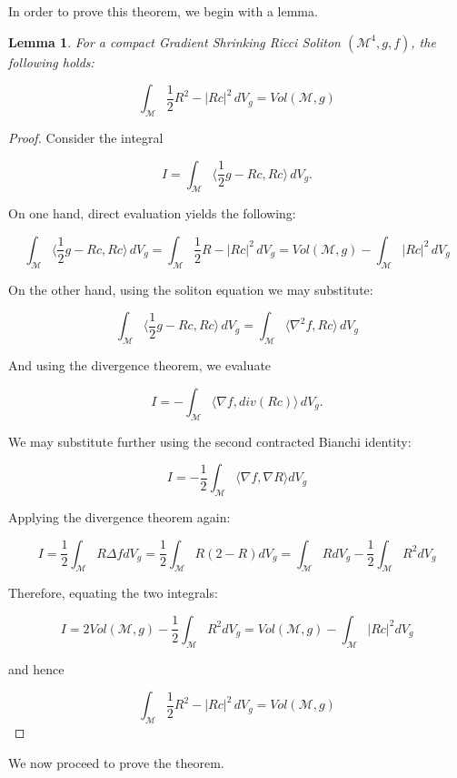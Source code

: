 \documentclass[openany, amssymb, psamsfonts]{amsart}
\newtheorem{lem}{Lemma}[section]
\theoremstyle{definition}
\numberwithin{equation}{section}
\begin{document}
In order to prove this theorem, we begin with a lemma. 

\begin{lem}
    For a compact Gradient Shrinking Ricci Soliton $(\mathcal{M}^4, g, f)$, the following holds:

    $$\int_{\mathcal{M}} \frac{1}{2} R^2 - |Rc|^2 \,dV_g = Vol(\mathcal{M}, g) $$
\end{lem}

\begin{proof}
Consider the integral

$$ I = \int_{\mathcal{M}} \langle \frac{1}{2}g - Rc, Rc \rangle \,dV_g.$$

On one hand, direct evaluation yields the following:

$$\int_{\mathcal{M}} \langle \frac{1}{2}g - Rc, Rc \rangle \,dV_g = 
 \int_{\mathcal{M}} \frac{1}{2}R - |Rc|^2 \,dV_g = 
 Vol(\mathcal{M}, g) - \int_{\mathcal{M}} |Rc|^2  \,dV_g$$

On the other hand, using the soliton equation we may substitute:

$$\int_{\mathcal{M}} \langle \frac{1}{2}g - Rc, Rc \rangle \,dV_g = 
\int_{\mathcal{M}} \langle \nabla ^2 f, Rc \rangle \,dV_g$$

And using the divergence theorem, we evaluate 

$$I = - \int_{\mathcal{M}} \langle \nabla f, div(Rc) \rangle \,dV_g.$$

We may substitute further using the second contracted Bianchi identity:

$$I = - \frac{1}{2} \int_{\mathcal{M}} \langle \nabla f, \nabla R \rangle dV_g$$

Applying the divergence theorem again:

$$I = \frac{1}{2}\int_{\mathcal{M}} R \Delta f dV_g= \frac{1}{2}\int_{\mathcal{M}} R(2 - R) dV_g = \int_{\mathcal{M}} R dV_g - \frac{1}{2}\int_{\mathcal{M}} R^2 dV_g$$

Therefore, equating the two integrals:

$$I = 2Vol(\mathcal{M}, g) - \frac{1}{2}\int_{\mathcal{M}} R^2 dV_g = Vol(\mathcal{M}, g) - \int_{\mathcal{M}} |Rc|^2 dV_g$$

and hence 

 $$\int_{\mathcal{M}} \frac{1}{2} R^2 - |Rc|^2 \,dV_g = Vol(\mathcal{M}, g) $$

\end{proof}

We now proceed to prove the theorem. 
\end{document}
